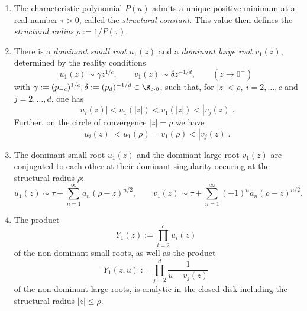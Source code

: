 \begin{proposition}
\begin{enumerate}
    \item The characteristic polynomial $P(u)$ admits a unique positive minimum at a real number $\tau > 0$, called the \textit{structural constant}. This value then defines the \textit{structural radius} $\rho := 1/P(\tau)$. 
    \item There is a \textit{dominant small root} $u_1(z)$ and a \textit{dominant large root} $v_1(z)$, determined by the reality conditions
    $$
      u_1(z) \sim \gamma z^{1/c}, \qquad v_1(z) \sim \delta z^{-1/d}, \qquad (z \to 0^+)
    $$
    with $\gamma := (p_{-c})^{1/c}, \delta := (p_d)^{-1/d} \in \R_{> 0}$,
    such that, for $|z| < \rho, ~ i = 2,\dots,c$ and $j = 2,\dots,d$, one has
    \begin{equation*}
      |u_i(z)| < u_1(|z|) < v_1(|z|) < |v_j(z)|.
    \end{equation*}
    Further, on the circle of convergence $|z| = \rho$ we have
    $$
    |u_i(z)| < u_1(\rho) = v_1(\rho) < |v_j(z)|.
    $$
    \item The dominant small root $u_1(z)$ and the dominant large root $v_1(z)$ are conjugated to each other at their dominant singularity occuring at the structural radius $\rho$:
    \begin{equation*}
      u_1(z) \sim \tau + \sum_{n = 1}^\infty a_n (\rho - z)^{n/2}, \qquad 
      v_1(z) \sim \tau + \sum_{n = 1}^\infty (-1)^n a_n (\rho - z)^{n/2}.
    \end{equation*}
    \item The product 
    $$
      Y_1(z) := \prod_{i=2}^c u_i(z)
    $$ 
    of the non-dominant small roots, as well as the product 
    $$
      \overline{Y_1}(z,u) := \prod_{j = 2}^d \frac{1}{u - v_j(z)}
    $$
    of the non-dominant large roots, is analytic in the closed disk including the structural radius $|z| \leq \rho$.
  \end{enumerate}
\end{proposition}

